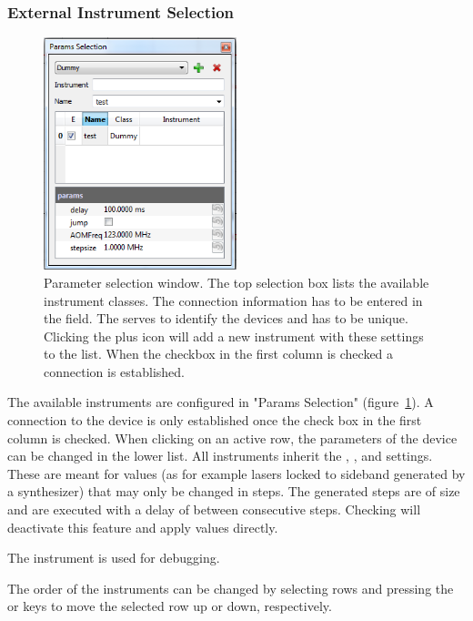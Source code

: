 \documentclass[11pt]{scrartcl}
\begin{document}
\subsubsection{External Instrument Selection}

\begin{figure}
\centering
\includegraphics[width=0.5\textwidth]{ParamsSelection}
\caption{\label{ParamsSelection} Parameter selection window. The top selection box lists the available instrument classes. The connection information has to be entered in the \protect{} field. The \protect{} serves to identify the devices and has to be unique. Clicking the plus icon will add a new instrument with these settings to the list. When the checkbox in the first column is checked a connection is established.}
\end{figure}

The available instruments are configured in "Params Selection" (figure~\ref{ParamsSelection}). A connection to the device is only established once the check box in the first column is checked. When clicking on an active row, the parameters of the device can be changed in the lower list. All instruments inherit the , , and  settings. These are meant for values (as for example lasers locked to sideband generated by a synthesizer) that may only be changed in steps. The generated steps are of size  and are executed with a delay of  between consecutive steps. Checking  will deactivate this feature and apply values directly.

The  instrument is used for debugging.

The order of the instruments can be changed by selecting rows and pressing the  or  keys to move the selected row up or down, respectively.
\end{document}
